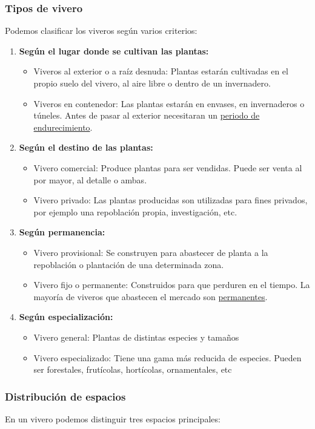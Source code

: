 \documentclass[a4paper,12pt,oneside]{article}
\begin{document}
\subsubsection{Tipos de vivero}
\label{sec:org7cf9463}
Podemos clasificar los viveros según varios criterios:\\
\begin{enumerate}
\item \textbf{Según el lugar donde se cultivan las plantas:}
\begin{itemize}
\item Viveros al exterior o a raíz desnuda: Plantas estarán cultivadas en el propio
suelo del vivero, al aire libre o dentro de un invernadero.
\item Viveros en contenedor: Las plantas estarán en envases, en invernaderos o
túneles. Antes de pasar al exterior necesitaran un \uline{periodo de
endurecimiento}.
\end{itemize}
\item \textbf{Según el destino de las plantas:}
\begin{itemize}
\item Vivero comercial: Produce plantas para ser vendidas. Puede ser venta al por
mayor, al detalle o ambas.
\item Vivero privado: Las plantas producidas son utilizadas para fines privados, por
ejemplo una repoblación propia, investigación, etc.
\end{itemize}

\item \textbf{Según permanencia:}
\begin{itemize}
\item Vivero provisional: Se construyen para abastecer de planta a la repoblación o
plantación de una determinada zona.
\item Vivero fijo o permanente: Construidos para que perduren en el tiempo. La
mayoría de viveros que abastecen el mercado son \uline{permanentes}.
\end{itemize}
\item \textbf{Según especialización:}
\begin{itemize}
\item Vivero general: Plantas de distintas especies y tamaños
\item Vivero especializado: Tiene una gama más reducida de especies. Pueden ser
forestales, frutícolas, hortícolas, ornamentales, etc
\end{itemize}
\end{enumerate}
\subsubsection{Distribución de espacios}
\label{sec:org1646705}
En un vivero podemos distinguir tres espacios principales:
\end{document}
